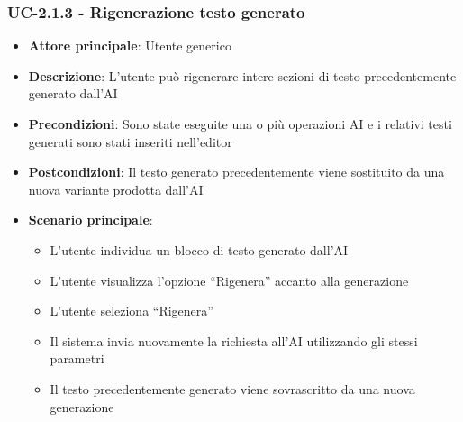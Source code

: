 \documentclass[11pt,a4paper]{article}
\begin{document}
\subsubsection{UC-2.1.3 - Rigenerazione testo generato}
\begin{itemize}
    \item \textbf{Attore principale}: Utente generico
    \item \textbf{Descrizione}: L’utente può rigenerare intere sezioni di testo precedentemente generato dall’AI
    \item \textbf{Precondizioni}: Sono state eseguite una o più operazioni AI e i relativi testi generati sono stati inseriti nell’editor
    \item \textbf{Postcondizioni}: Il testo generato precedentemente viene sostituito da una nuova variante prodotta dall'AI
    \item \textbf{Scenario principale}:
    \begin{itemize}
        \item L’utente individua un blocco di testo generato dall’AI
        \item L’utente visualizza l’opzione “Rigenera” accanto alla generazione
        \item L’utente seleziona “Rigenera”
        \item Il sistema invia nuovamente la richiesta all'AI utilizzando gli stessi parametri
        \item Il testo precedentemente generato viene sovrascritto da una nuova generazione
    \end{itemize}
\end{itemize}
\end{document}
